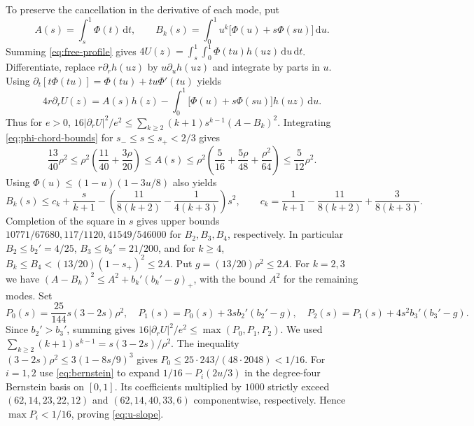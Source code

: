 \documentclass[11pt,a4paper,reqno]{amsart}
\theoremstyle{remark}
\numberwithin{equation}{section}
\newcommand{\dd}{\,\mathrm d}
\begin{document}
To preserve the cancellation in the derivative of each mode, put
\[
  A(s)=\int_s^1\Phi(t)\dd t,\qquad
  B_k(s)=\int_0^1 u^k\bigl[\Phi(u)+s\Phi(su)\bigr]\dd u.
\]
Summing \eqref{eq:free-profile} gives
$4U(z)=\int_s^1\int_0^1\Phi(tu)h(uz)\dd u\dd t$. Differentiate, replace
$r\partial_rh(uz)$ by $u\partial_uh(uz)$ and integrate by parts in $u$.
Using $\partial_t[t\Phi(tu)]=\Phi(tu)+tu\Phi'(tu)$ yields
\[
  4r\partial_r U(z)=A(s)h(z)-\int_0^1\bigl[\Phi(u)+s\Phi(su)\bigr]h(uz)\dd u.
\]
Thus for $e>0$, $16|\partial_r U|^2/e^2\le
\sum_{k\ge2}(k+1)s^{k-1}(A-B_k)^2$.
Integrating \eqref{eq:phi-chord-bounds} for $s_-\le s\le s_+<2/3$ gives
\[
  \frac{13}{40}\rho^2\le\rho^2\left(\frac{11}{40}+\frac{3\rho}{20}\right)
    \le A(s)\le\rho^2\left(\frac{5}{16}+\frac{5\rho}{48}+\frac{\rho^2}{64}\right)
    \le\frac{5}{12}\rho^2.
\]
Using $\Phi(u)\le(1-u)(1-3u/8)$ also yields
\[
  B_k(s)\le c_k+\frac{s}{k+1}-\left(\frac{11}{8(k+2)}-\frac{1}{4(k+3)}\right)s^2,
  \qquad
  c_k=\frac{1}{k+1}-\frac{11}{8(k+2)}+\frac{3}{8(k+3)}.
\]
Completion of the square in $s$ gives upper bounds
$10771/67680,117/1120,41549/546000$ for $B_2,B_3,B_4$, respectively.
In particular $B_2\le b_2'=4/25$, $B_3\le b_3'=21/200$, and for $k\ge4$,
$B_k\le B_4<(13/20)(1-s_+)^2\le2A$. Put $g=(13/20)\rho^2\le2A$.
For $k=2,3$ we have $(A-B_k)^2\le A^2+b_k'(b_k'-g)_+$, with the
bound $A^2$ for the remaining modes. Set
\[
  P_0(s)=\frac{25}{144}s(3-2s)\rho^2,\quad
  P_1(s)=P_0(s)+3sb_2'(b_2'-g),\quad
  P_2(s)=P_1(s)+4s^2 b_3'(b_3'-g).
\]
Since $b_2'>b_3'$, summing gives
$16|\partial_rU|^2/e^2\le\max(P_0,P_1,P_2)$. We used
$\sum_{k\ge2}(k+1)s^{k-1}=s(3-2s)/\rho^2$. The inequality
$(3-2s)\rho^2\le3(1-8s/9)^3$ gives
$P_0\le25\cdot243/(48\cdot2048)<1/16$. For $i=1,2$ use
\eqref{eq:bernstein} to expand $1/16-P_i(2u/3)$ in the degree-four
Bernstein basis on $[0,1]$. Its coefficients multiplied by $1000$ strictly
exceed $(62,14,23,22,12)$ and $(62,14,40,33,6)$ componentwise,
respectively. Hence $\max P_i<1/16$, proving \eqref{eq:u-slope}.
\end{document}

